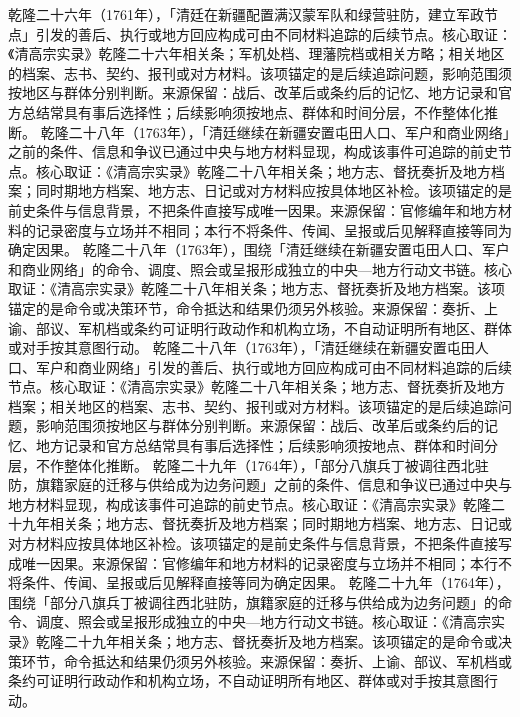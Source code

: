 乾隆二十六年（1761年），「清廷在新疆配置满汉蒙军队和绿营驻防，建立军政节点」引发的善后、执行或地方回应构成可由不同材料追踪的后续节点。核心取证：《清高宗实录》乾隆二十六年相关条；军机处档、理藩院档或相关方略；相关地区的档案、志书、契约、报刊或对方材料。该项锚定的是后续追踪问题，影响范围须按地区与群体分别判断。来源保留：战后、改革后或条约后的记忆、地方记录和官方总结常具有事后选择性；后续影响须按地点、群体和时间分层，不作整体化推断。
乾隆二十八年（1763年），「清廷继续在新疆安置屯田人口、军户和商业网络」之前的条件、信息和争议已通过中央与地方材料显现，构成该事件可追踪的前史节点。核心取证：《清高宗实录》乾隆二十八年相关条；地方志、督抚奏折及地方档案；同时期地方档案、地方志、日记或对方材料应按具体地区补检。该项锚定的是前史条件与信息背景，不把条件直接写成唯一因果。来源保留：官修编年和地方材料的记录密度与立场并不相同；本行不将条件、传闻、呈报或后见解释直接等同为确定因果。
乾隆二十八年（1763年），围绕「清廷继续在新疆安置屯田人口、军户和商业网络」的命令、调度、照会或呈报形成独立的中央—地方行动文书链。核心取证：《清高宗实录》乾隆二十八年相关条；地方志、督抚奏折及地方档案。该项锚定的是命令或决策环节，命令抵达和结果仍须另外核验。来源保留：奏折、上谕、部议、军机档或条约可证明行政动作和机构立场，不自动证明所有地区、群体或对手按其意图行动。
乾隆二十八年（1763年），「清廷继续在新疆安置屯田人口、军户和商业网络」引发的善后、执行或地方回应构成可由不同材料追踪的后续节点。核心取证：《清高宗实录》乾隆二十八年相关条；地方志、督抚奏折及地方档案；相关地区的档案、志书、契约、报刊或对方材料。该项锚定的是后续追踪问题，影响范围须按地区与群体分别判断。来源保留：战后、改革后或条约后的记忆、地方记录和官方总结常具有事后选择性；后续影响须按地点、群体和时间分层，不作整体化推断。
乾隆二十九年（1764年），「部分八旗兵丁被调往西北驻防，旗籍家庭的迁移与供给成为边务问题」之前的条件、信息和争议已通过中央与地方材料显现，构成该事件可追踪的前史节点。核心取证：《清高宗实录》乾隆二十九年相关条；地方志、督抚奏折及地方档案；同时期地方档案、地方志、日记或对方材料应按具体地区补检。该项锚定的是前史条件与信息背景，不把条件直接写成唯一因果。来源保留：官修编年和地方材料的记录密度与立场并不相同；本行不将条件、传闻、呈报或后见解释直接等同为确定因果。
乾隆二十九年（1764年），围绕「部分八旗兵丁被调往西北驻防，旗籍家庭的迁移与供给成为边务问题」的命令、调度、照会或呈报形成独立的中央—地方行动文书链。核心取证：《清高宗实录》乾隆二十九年相关条；地方志、督抚奏折及地方档案。该项锚定的是命令或决策环节，命令抵达和结果仍须另外核验。来源保留：奏折、上谕、部议、军机档或条约可证明行政动作和机构立场，不自动证明所有地区、群体或对手按其意图行动。
